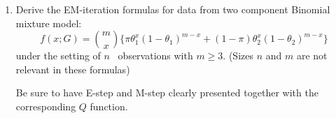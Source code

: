 \begin{enumerate}
(a) Show that the sample median satisfies
\[ 
P ( n^{ 1/4 } | x_{(n+1)} - \theta | \geq \epsilon ) \to 0
\] 
for any $\epsilon > 0$ as $ n \to \infty $. 

{\bf Remark}: directly proving this result is challenging for inexperienced.
Proving it by directly quoting an existing result is not satisfactory.

(b) Derive the explicit expression of the Newton-Raphson iteration
for Cauchy distribution. 

(c) Simulation $N=1000$ times with $2n+1=201$, $\theta = 0$
and obtain total MSEs in the same way as the last example. 
Clearly present your results.

(d) Plot the histogram of the 1000 $X_{(n+1)}$. Do the same for the
one-step Newtwon-Raphson estimator. 

(e) Do these histograms support our asymptotic results on
MLE and on median?


\item
Derive the EM-iteration formulas for data from two component 
Binomial mixture model:
\[
f(x; G) = {m \choose x} \{ \pi \theta_1^x (1-\theta_1)^{m-x} + (1-\pi) \theta_2^x (1-\theta_2)^{m-x}\}
\]
under the setting of $n$ \iid\ observations with $m \geq 3$.
(Sizes $n$ and $m$ are not relevant in these formulas)

Be sure to have E-step and M-step clearly presented together 
with the corresponding $Q$ function.
\end{enumerate}
